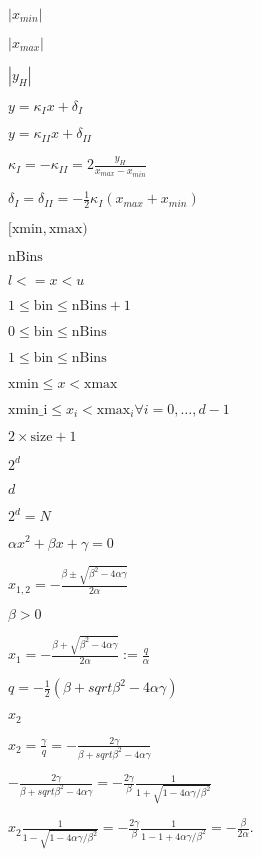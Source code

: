 \documentclass{article}
\begin{document}
$ |x_{min}| $
\pagebreak

$ | x_{max} | $
\pagebreak

$ | y_{H} | $
\pagebreak

$ y = \kappa_{I} x + \delta_{I} $
\pagebreak

$ y = \kappa_{II} x + \delta_{II} $
\pagebreak

$ \kappa_{I} = - \kappa_{II} = 2 \frac{y_{H}}{x_{max} - x_{min}} $
\pagebreak

$ \delta_{I} = \delta_{II} = - \frac{1}{2}\kappa_{I}(x_{max} + x_{min}) $
\pagebreak

$[\text{xmin},\text{xmax})$
\pagebreak

$\text{nBins}$
\pagebreak

$l <= x < u$
\pagebreak

$1 \le \text{bin} \le \text{nBins} + 1$
\pagebreak

$0 \le \text{bin} \le \text{nBins}$
\pagebreak

$1 \le \text{bin} \le \text{nBins}$
\pagebreak

$\text{xmin} \le x < \text{xmax}$
\pagebreak

$\text{xmin_i} \le x_i < \text{xmax}_i \forall i=0, \dots, d-1$
\pagebreak

$2 \times \text{size}+1$
\pagebreak

$2^d$
\pagebreak

$d$
\pagebreak

$2^d = N $
\pagebreak

$ \alpha x^{2} + \beta x + \gamma = 0 $
\pagebreak

$ x_{1, 2} = - \frac{\beta \pm \sqrt{\beta^{2}-4\alpha\gamma}}{2\alpha}$
\pagebreak

$ \beta > 0 $
\pagebreak

$ x_{1} = - \frac{\beta + \sqrt{\beta^{2}-4\alpha\gamma}}{2\alpha} := \frac{q}{\alpha}$
\pagebreak

$ q= -\frac{1}{2}(\beta+sqrt{\beta^{2}-4\alpha\gamma})$
\pagebreak

$ x_{2} $
\pagebreak

$ x_{2} = \frac{\gamma}{q} = -\frac{2\gamma}{\beta+sqrt{\beta^{2}-4\alpha\gamma}}$
\pagebreak

$ -\frac{2\gamma}{\beta+sqrt{\beta^{2}-4\alpha\gamma}} = -\frac{2\gamma}{\beta}\frac{1}{1+\sqrt{1-4\alpha\gamma/\beta^{2}}}$
\pagebreak

$ x_{2}\frac{1}{1-\sqrt{1-4\alpha\gamma/\beta^{2}}} = -\frac{2\gamma}{\beta}\frac{1}{1-1+4\alpha\gamma/\beta^{2}}=-\frac{\beta}{2\alpha}.$
\pagebreak
\end{document}
